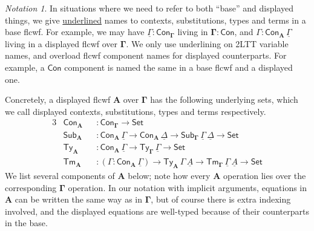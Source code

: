 \documentclass[12pt,a4paper,twoside,openany]{book}
\theoremstyle{remark}
\newtheorem{notation}{Notation}
\theoremstyle{definition}
\theoremstyle{theorem}
\newcommand{\bs}[1]{\boldsymbol{#1}}
\newcommand{\Con}{\mathsf{Con}}
\newcommand{\Sub}{\mathsf{Sub}}
\newcommand{\Tm}{\mathsf{Tm}}
\newcommand{\Ty}{\mathsf{Ty}}
\newcommand{\ra}{\rightarrow}
\newcommand{\Set}{\mathsf{Set}}
\newcommand{\bGamma}{\bs{\Gamma}}
\newcommand{\bA}{\bs{A}}
\newcommand{\ul}[1]{\underline{#1}}
\newcommand{\ulGamma}{\ul{\Gamma}}
\newcommand{\ulDelta}{\ul{\Delta}}
\newcommand{\ulA}{\ul{A}}
\begin{document}
\begin{notation} In situations where we need to refer to both ``base'' and
displayed things, we give \ul{underlined} names to contexts, substitutions,
types and terms in a base flcwf. For example, we may have $\ulGamma :
\Con_{\bGamma}$ living in $\bs{\Gamma : \Con}$, and $\Gamma :
\Con_{\bA}\,\ulGamma$ living in a displayed flcwf over $\bGamma$. We only use
underlining on 2LTT variable names, and overload flcwf component names for
displayed counterparts. For example, a $\Con$ component is named the same in
a base flcwf and a displayed one.
\end{notation}

Concretely, a displayed flcwf $\bA$ over $\bGamma$ has the following underlying
sets, which we call displayed contexts, substitutions, types and terms
respectively.
\begin{alignat*}{3}
  & \Con_{\bA} && : \Con_{\bGamma}\ra \Set\\
  & \Sub_{\bA} && : \Con_{\bA}\,\ulGamma \ra \Con_{\bA}\,\ulDelta \ra \Sub_{\bGamma}\,\ulGamma\,\ulDelta \ra \Set \\
  & \Ty_{\bA}  && : \Con_{\bA}\,\ulGamma \ra \Ty_{\bGamma}\,\ulGamma \ra \Set\\
  & \Tm_{\bA}  && : (\Gamma : \Con_{\bA}\,\ulGamma)\ra \Ty_{\bA}\,\Gamma\,\ulA \ra \Tm_{\bGamma}\,\ulGamma\,\ulA \ra \Set
\end{alignat*}
We list several components of $\bA$ below; note how every $\bA$ operation lies
over the corresponding $\bGamma$ operation. In our notation with implicit
arguments, equations in $\bA$ can be written the same way as in $\bGamma$, but
of course there is extra indexing involved, and the displayed equations are
well-typed because of their counterparts in the base.
\begingroup
\allowdisplaybreaks
\end{document}
